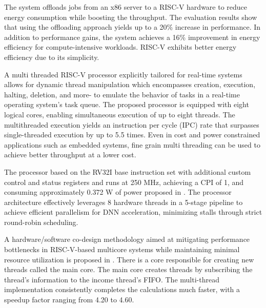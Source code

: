 \documentclass[conference]{IEEEtran}
\begin{document}
\begin{flushleft}
The system \cite{OffloadRISCV} offloads jobs from an x86 server to a RISC-V hardware to reduce energy consumption while boosting the throughput. The evaluation results show that using the offloading approach yields up to a 20\% increase in performance. In addition to performance gains, the system achieves a 16\% improvement in energy efficiency for compute-intensive workloads. RISC-V exhibits better energy efficiency due to its simplicity.
\end{flushleft}

\begin{flushleft}
A multi threaded RISC-V processor \cite{MTRTS} explicitly tailored for real-time systems allows for dynamic thread manipulation which encompasses creation, execution, halting, deletion, and more- to emulate the behavior of tasks in a real-time operating system’s task queue. The proposed processor is equipped with eight logical cores, enabling simultaneous execution of up to eight threads. The multithreaded execution yields an instruction per cycle (IPC) rate that surpasses single-threaded execution by up to 5.5 times. Even in cost and power constrained applications such as embedded systems, fine grain multi threading can be used to achieve better throughput at a lower cost.
\end{flushleft}

\begin{flushleft}
The processor based on the RV32I base instruction set with additional custom control and status registers and runs at 250 MHz, achieving a CPI of 1, and consuming approximately 0.372 W of power proposed in \cite{NNAccel}. The processor architecture effectively leverages 8 hardware threads in a 5-stage pipeline to achieve efficient parallelism for DNN acceleration, minimizing stalls through strict round-robin scheduling.
\end{flushleft}

\begin{flushleft}
A hardware/software co-design methodology aimed at mitigating performance bottlenecks in RISC-V-based multicore systems while maintaining minimal resource utilization is proposed in \cite{MTCODES}. There is a core responsible for creating new threads called the main core. The main core creates threads by subscribing the thread’s information to the income thread’s FIFO. The multi-thread implementation consistently completes the calculations much faster, with a speedup factor ranging from 4.20 to 4.60.
\end{flushleft}
\end{document}
